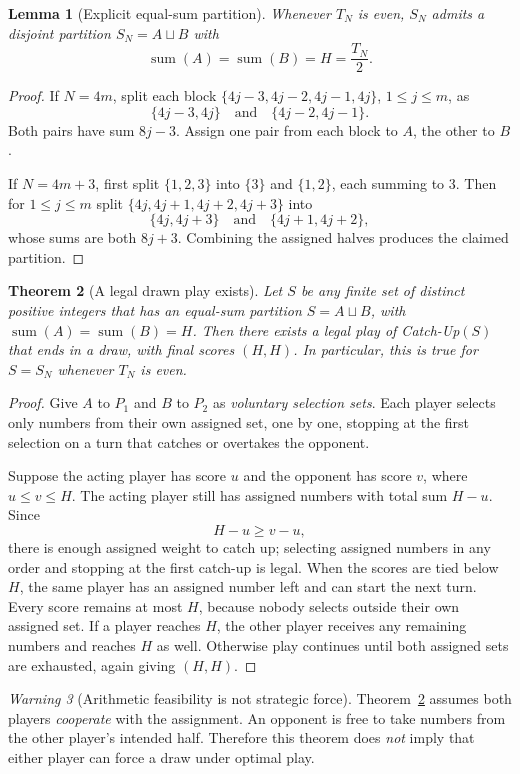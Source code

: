 \documentclass[11pt,a4paper]{article}
\newtheorem{theorem}{Theorem}[section]
\newtheorem{lemma}[theorem]{Lemma}
\theoremstyle{definition}
\theoremstyle{remark}
\newtheorem{warning}[theorem]{Warning}
\newcommand{\SN}{S_N}
\newcommand{\TN}{T_N}
\newcommand{\sm}{\operatorname{sum}}
\begin{document}
\begin{lemma}[Explicit equal-sum partition]
\label{lem:partition}
Whenever $\TN$ is even, $\SN$ admits a disjoint partition
$\SN=A\sqcup B$ with
\[
\sm(A)=\sm(B)=H=\frac{\TN}{2}.
\]
\end{lemma}
\begin{proof}
If $N=4m$, split each block
$\{4j-3,4j-2,4j-1,4j\}$, $1\le j\le m$, as
\[
\{4j-3,4j\}\quad\text{and}\quad\{4j-2,4j-1\}.
\]
Both pairs have sum $8j-3$.  Assign one pair from each block to
$A$, the other to $B$.

If $N=4m+3$, first split $\{1,2,3\}$ into $\{3\}$ and
$\{1,2\}$, each summing to $3$.  Then for $1\le j\le m$ split
$\{4j,4j+1,4j+2,4j+3\}$ into
\[
\{4j,4j+3\}\quad\text{and}\quad\{4j+1,4j+2\},
\]
whose sums are both $8j+3$.  Combining the assigned halves produces
the claimed partition.
\end{proof}

\begin{theorem}[A legal drawn play exists]
\label{thm:exists}
Let $S$ be any finite set of distinct positive integers that has an
equal-sum partition $S=A\sqcup B$, with
$\sm(A)=\sm(B)=H$.  Then \emph{there exists a legal play} of
Catch-Up$(S)$ that ends in a draw, with final scores $(H,H)$.
In particular, this is true for $S=\SN$ whenever $\TN$ is even.
\end{theorem}
\begin{proof}
Give $A$ to $P_1$ and $B$ to $P_2$ as \emph{voluntary selection
sets}.  Each player selects only numbers from their own assigned
set, one by one, stopping at the first selection on a turn that
catches or overtakes the opponent.

Suppose the acting player has score $u$ and the opponent has score
$v$, where $u\le v\le H$.  The acting player still has assigned
numbers with total sum $H-u$.  Since
\[
H-u\ge v-u,
\]
there is enough assigned weight to catch up; selecting assigned
numbers in any order and stopping at the first catch-up is legal.
When the scores are tied below $H$, the same player has an assigned
number left and can start the next turn.  Every score remains at
most $H$, because nobody selects outside their own assigned set.
If a player reaches $H$, the other player receives any remaining
numbers and reaches $H$ as well.  Otherwise play continues until both
assigned sets are exhausted, again giving $(H,H)$.
\end{proof}

\begin{warning}[Arithmetic feasibility is not strategic force]
Theorem~\ref{thm:exists} assumes both players \emph{cooperate} with
the assignment.  An opponent is free to take numbers from the other
player's intended half.  Therefore this theorem does \emph{not}
imply that either player can force a draw under optimal play.
\end{warning}
\end{document}
